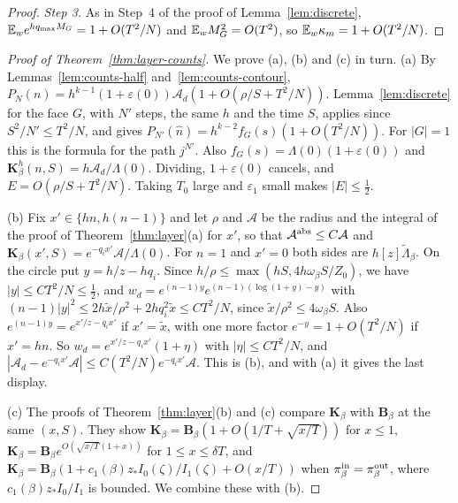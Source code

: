 \begin{proof}
\emph{Step 3.} As in Step~4 of the proof of Lemma~\ref{lem:discrete},
$\mathbb{E}_we^{hq_{\max}M_G}=1+O(T^2/N)$ and $\mathbb{E}_wM_G^2=O(T^2)$, so $\mathbb{E}_w\kappa_m=1+O(T^2/N)$.
\end{proof}

\begin{proof}[Proof of Theorem~\ref{thm:layer-counts}]
We prove (a), (b) and (c) in turn. (a) By Lemmas~\ref{lem:counts-half} and~\ref{lem:counts-contour},
$P_N(n)=h^{k-1}(1+\varepsilon(0))\mathcal A_d(1+O(\rho/S+T^2/N))$. Lemma~\ref{lem:discrete} for the
face $G$, with $N'$ steps, the same $h$ and the time $S$, applies since $S^2/N'\le T^2/N$, and
gives $P_{N'}(\hat n)=h^{k-2}f_G(s)(1+O(T^2/N))$. For $|G|=1$ this is the formula for the path
$j^{N'}$. Also $f_G(s)=\Lambda(0)(1+\varepsilon(0))$ and $\mathbf K^h_\beta(n,S)=h\mathcal A_d/\Lambda(0)$.
Dividing, $1+\varepsilon(0)$ cancels, and $E=O(\rho/S+T^2/N)$. Taking $T_0$ large and
$\varepsilon_1$ small makes $|E|\le\frac12$.

(b) Fix $x'\in\{hn,h(n-1)\}$ and let $\rho$ and $\mathcal A$ be the radius and the integral of the
proof of Theorem~\ref{thm:layer}(a) for $x'$, so that $\mathcal A^{\rm abs}\le C\mathcal A$ and
$\mathbf K_\beta(x',S)=e^{-q_ix'}\mathcal A/\Lambda(0)$. For $n=1$ and $x'=0$ both sides are
$h[z]\widetilde\Lambda_\beta$. On the circle put $y=h/z-hq_i$. Since $h/\rho\le\max(hS,4h\omega_\beta S/Z_0)$,
we have $|y|\le CT^2/N\le\frac12$, and
$w_d=e^{(n-1)y}e^{(n-1)(\log(1+y)-y)}$ with $(n-1)|y|^2\le2h\tilde x/\rho^2+2hq_i^2\tilde x\le CT^2/N$,
since $\tilde x/\rho^2\le4\omega_\beta S$. Also $e^{(n-1)y}=e^{x'/z-q_ix'}$ if $x'=\tilde x$, with one
more factor $e^{-y}=1+O(T^2/N)$ if $x'=hn$. So $w_d=e^{x'/z-q_ix'}(1+\eta)$ with
$|\eta|\le CT^2/N$, and $|\mathcal A_d-e^{-q_ix'}\mathcal A|\le C(T^2/N)e^{-q_ix'}\mathcal A$. This is (b),
and with (a) it gives the last display.

(c) The proofs of Theorem~\ref{thm:layer}(b) and (c) compare $\mathbf K_\beta$ with $\mathbf B_\beta$
at the same $(x,S)$. They show $\mathbf K_\beta=\mathbf B_\beta(1+O(1/T+\sqrt{x/T}))$ for $x\le1$,
$\mathbf K_\beta=\mathbf B_\beta e^{O(\sqrt{x/T}(1+x))}$ for $1\le x\le\delta T$, and
$\mathbf K_\beta=\mathbf B_\beta(1+c_1(\beta)z_*I_0(\zeta)/I_1(\zeta)+O(x/T))$ when
$\pi^{\rm in}_\beta=\pi^{\rm out}_\beta$, where $c_1(\beta)z_*I_0/I_1$ is bounded. We combine these
with (b).
\end{proof}
